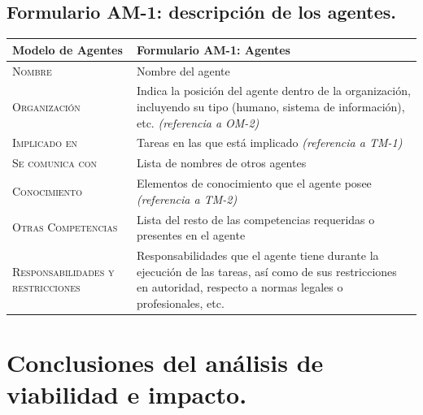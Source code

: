 \documentclass[12pt,a4paper,twoside,spanish]{article}      %
\begin{document}
        \pagebreak
        
    \subsection{Formulario AM-1: descripción de los agentes.}
        
        \begin{table}[H]
            \scriptsize
            \begin{tabularx}{\textwidth}{|l|X|} \hline
                \textbf{Modelo de Agentes} & \textbf{Formulario AM-1: Agentes} \\ \hline\hline
                
                \textsc{Nombre} &  Nombre del agente \\ \hline
                
                \textsc{Organización} &  Indica la posición del agente dentro de la organización, incluyendo su tipo (humano, sistema de información), etc. \emph{(referencia a OM-2)}\\ \hline
                
                \textsc{Implicado en} & Tareas en las que está implicado \emph{(referencia a TM-1)} \\ \hline
                
                \textsc{Se comunica con} &  Lista de nombres de otros agentes  \\ \hline
                
                \textsc{Conocimiento} &  Elementos de conocimiento que el agente posee \emph{(referencia a TM-2)} \\ \hline
                
                \textsc{Otras Competencias} &  Lista del resto de las competencias requeridas o presentes en el agente \\ \hline
                
                \textsc{Responsabilidades y restricciones} &  Responsabilidades que el agente tiene durante la ejecución de las tareas, así como de sus restricciones en autoridad, respecto a normas legales o profesionales, etc.\\ \hline
            \end{tabularx}
             \label{tab.AM1}
        \end{table}
        
        
        \pagebreak
        
    \section{Conclusiones del análisis de viabilidad e impacto.}
    
\end{document}

